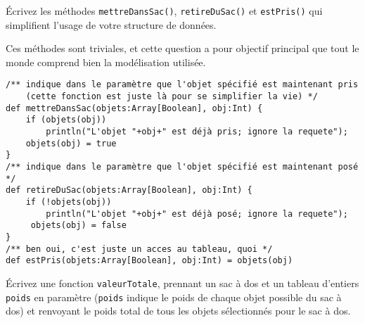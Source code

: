 \documentclass[10pt]{article}\usepackage[correction,nu]{esial}
\begin{document}


\Question Écrivez les méthodes \texttt{mettreDansSac()}, \texttt{retireDuSac()} et
\texttt{estPris()} qui simplifient l'usage de votre structure de données.

\begin{Reponse}
  Ces méthodes sont triviales, et cette question a pour objectif principal que
  tout le monde comprend bien la modélisation utilisée.
  \begin{Verbatim}
/** indique dans le paramètre que l'objet spécifié est maintenant pris
    (cette fonction est juste là pour se simplifier la vie) */
def mettreDansSac(objets:Array[Boolean], obj:Int) {
    if (objets(obj)) 
        println("L'objet "+obj+" est déjà pris; ignore la requete");
    objets(obj) = true
}
/** indique dans le paramètre que l'objet spécifié est maintenant posé */
def retireDuSac(objets:Array[Boolean], obj:Int) {
    if (!objets(obj)) 
        println("L'objet "+obj+" est déjà posé; ignore la requete");
     objets(obj) = false
}
/** ben oui, c'est juste un acces au tableau, quoi */
def estPris(objets:Array[Boolean], obj:Int) = objets(obj)
  \end{Verbatim}
\end{Reponse}

\Question Écrivez une fonction \texttt{valeurTotale}, prennant un sac à dos et
un tableau d'entiers \texttt{poids} en paramètre (\texttt{poids} indique le
poids de chaque objet possible du sac à dos) et renvoyant le poids total de tous
les objets sélectionnés pour le sac à dos.
\end{document}
